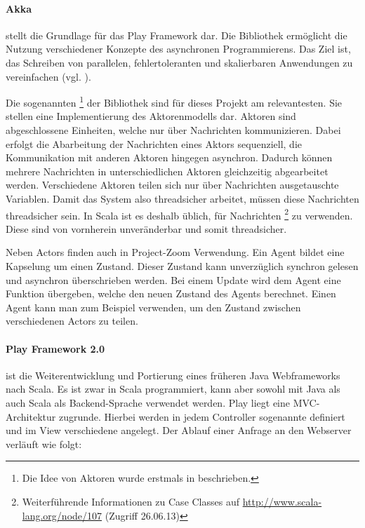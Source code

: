 \paragraph{Akka}\label{sec:actor} stellt die Grundlage für das Play \gls{Framework} dar. Die Bibliothek ermöglicht die Nutzung verschiedener Konzepte des asynchronen Programmierens. Das Ziel ist, das Schreiben von parallelen, fehlertoleranten und skalierbaren Anwendungen zu vereinfachen (vgl. \cite{what-is-akka}). 

Die sogenannten \footnote{Die Idee von Aktoren wurde erstmals in \cite{actors} beschrieben.} der Bibliothek sind für dieses Projekt am relevantesten. Sie stellen eine Implementierung des Aktorenmodells dar. Aktoren sind abgeschlossene Einheiten, welche nur über Nachrichten kommunizieren. Dabei erfolgt die Abarbeitung der Nachrichten eines Aktors sequenziell, die Kommunikation mit anderen Aktoren hingegen asynchron. Dadurch können mehrere Nachrichten in unterschiedlichen Aktoren gleichzeitig abgearbeitet werden. Verschiedene Aktoren teilen sich nur über Nachrichten ausgetauschte Variablen. Damit das System also threadsicher arbeitet, müssen diese Nachrichten threadsicher sein. In Scala ist es deshalb üblich, für Nachrichten \footnote{Weiterführende Informationen zu Case Classes auf \url{ http://www.scala-lang.org/node/107} (Zugriff 26.06.13)} zu verwenden. Diese sind von vornherein unveränderbar und somit threadsicher.

Neben Actors finden auch  in Project-Zoom Verwendung. Ein Agent bildet eine Kapselung um einen Zustand. Dieser Zustand kann unverzüglich synchron gelesen und asynchron überschrieben werden. Bei einem Update wird dem Agent eine Funktion übergeben, welche den neuen Zustand des Agents berechnet. Einen Agent kann man zum Beispiel verwenden, um den Zustand zwischen verschiedenen Actors zu teilen.

\paragraph{Play \gls{Framework} 2.0} ist die Weiterentwicklung und Portierung eines früheren Java Webframeworks nach Scala. Es ist zwar in Scala programmiert, kann aber sowohl mit Java als auch Scala als \gls{Backend}-Sprache verwendet werden. Play liegt eine MVC-Architektur zugrunde. Hierbei werden in jedem Controller sogenannte  definiert und im View verschiedene  angelegt. Der Ablauf einer Anfrage an den Webserver verläuft wie folgt:

